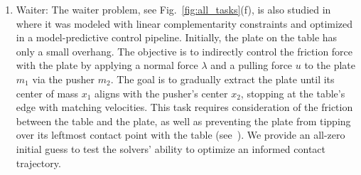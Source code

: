 \begin{enumerate}
\item Waiter: The waiter problem, see Fig.~\ref{fig:all_tasks}(f), is also studied in~\cite{RSS-yang-2024} where it was modeled with linear complementarity constraints and optimized in a model-predictive control pipeline. Initially, the plate on the table has only a small overhang. The objective is to indirectly control the friction force with the plate by applying a normal force $\lambda$ and a pulling force $u$ to the plate $m_1$ via the pusher $m_2$. The goal is to gradually extract the plate until its center of mass $x_1$ aligns with the pusher's center $x_2$, stopping at the table's edge with matching velocities. This task requires consideration of the friction between the table and the plate, as well as preventing the plate from tipping over its leftmost contact point with the table (see~). We provide an all-zero initial guess to test the solvers' ability to optimize an informed contact trajectory.




\end{enumerate}
